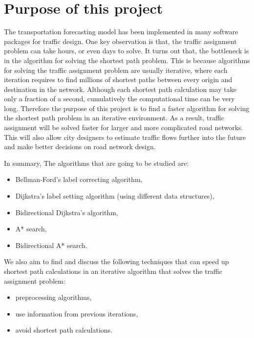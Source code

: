 \section{Purpose of this project}
The transportation forecasting model has been implemented in many software packages for traffic design.
One key observation is that,
the traffic assignment problem can take hours, or even days to solve.
It turns out that,
the bottleneck is in the algorithm for solving the shortest path problem.
This is because algorithms for solving the traffic assignment problem are usually iterative,
where each iteration requires to find millions of shortest paths between every origin and destination in the network.
Although each shortest path calculation may take only a fraction of a second,
cumulatively the computational time can be very long.
Therefore the purpose of this project is to find a faster algorithm for solving the shortest path problem in an iterative environment.
As a result, traffic assignment will be solved faster
for larger and more complicated road networks.
This will also allow city designers to estimate traffic flows further into the future and make better decisions on road network design.

In summary,
The algorithms that are going to be studied are:
\begin{itemize}
    \item Bellman-Ford's label correcting algorithm,
    \item Dijkstra's label setting algorithm (using different data structures),
    \item Bidirectional Dijkstra's algorithm,
    \item A* search,
    \item Bidirectional A* search.
\end{itemize}

We also aim to find and discuss the following techniques that can speed up shortest path calculations in an iterative algorithm that solves the traffic assignment problem:
\begin{itemize}
    \item preprocessing algorithms,
    \item use information from previous iterations,
    \item avoid shortest path calculations.
\end{itemize}

